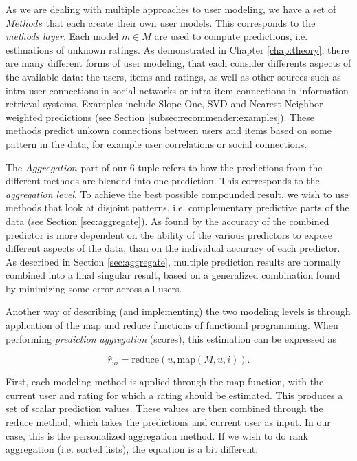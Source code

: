 As we are dealing with multiple approaches to user modeling, we have a set of $Methods$ that each create their own
user models. 
This corresponds to the \emph{methods layer}.
Each model $m \in M$ are used to compute predictions, i.e. estimations of unknown ratings.
As demonstrated in Chapter \ref{chap:theory}, there are many different forms of user modeling,
that each consider differents aspects of the available data: the users, items and ratings, as well as 
other sources such as intra-user connections in social networks or intra-item connections in information retrieval systems.
Examples include Slope One, SVD and Nearest Neighbor weighted predictions
(see Section \ref{subsec:recommender:examples}).
These methods predict unkown connections between users and items based on some pattern in the data,
for example user correlations or social connections.

The $Aggregation$ part of our 6-tuple refers to how the predictions from the different methods are blended
into one prediction. 
This corresponds to the \emph{aggregation level}.
To achieve the best possible compounded result, we wish to use methods that look at disjoint patterns, 
i.e. complementary predictive parts of the data (see Section \ref{sec:aggregate}).
As found by \citet[p6]{Bell2007} the accuracy of the combined predictor is more dependent on the 
ability of the various predictors to expose different aspects of the data, than on 
the individual accuracy of each predictor.
As described in Section \ref{sec:aggregate}, multiple prediction results are normally 
combined into a final singular result,
based on a generalized combination found by minimizing some error across all users.

Another way of describing (and implementing) the two modeling levels is through application
of the $\mathrm{map}$ and $\mathrm{reduce}$ functions of functional programming.
When performing \emph{prediction aggregation} (scores), this estimation can be expressed as

\begin{equation*}
  \hat{r}_{ui} = \mathrm{reduce}(u, \mathrm{map}(M,u,i)).
\end{equation*}

First, each modeling method is applied through the $\mathrm{map}$ function, with the current user and rating for which
a rating should be estimated. This produces a set of scalar prediction values. These values are then
combined through the $\mathrm{reduce}$ method, which takes the predictions and current user as input.
In our case, this is the personalized aggregation method. 
If we wish to do rank aggregation (i.e. sorted lists), the equation is a bit different:

